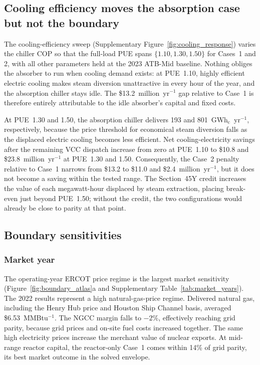 \documentclass[a4paper,fleqn]{cas-sc}
\begin{document}
\subsection{Cooling efficiency moves the absorption case but not the boundary}
\label{sec:results:pue}

The cooling-efficiency sweep (Supplementary Figure~\ref{fig:cooling_response}) varies the chiller COP so that the full-load PUE spans $\{1.10, 1.30, 1.50\}$ for Cases~1 and 2, with all other parameters held at the 2023 ATB-Mid baseline. Nothing obliges the absorber to run when cooling demand exists: at PUE~1.10, highly efficient electric cooling makes steam diversion unattractive in every hour of the year, and the absorption chiller stays idle. The \$13.2~million~yr$^{-1}$ gap relative to Case~1 is therefore entirely attributable to the idle absorber's capital and fixed costs.

At PUE~1.30 and 1.50, the absorption chiller delivers 193 and 801~GWh$_\mathrm{c}$~yr$^{-1}$, respectively, because the price threshold for economical steam diversion falls as the displaced electric cooling becomes less efficient. Net cooling-electricity savings after the remaining VCC dispatch increase from zero at PUE~1.10 to \$10.8 and \$23.8~million~yr$^{-1}$ at PUE~1.30 and 1.50. Consequently, the Case~2 penalty relative to Case~1 narrows from \$13.2 to \$11.0 and \$2.4~million~yr$^{-1}$, but it does not become a saving within the tested range. The Section~45Y credit increases the value of each megawatt-hour displaced by steam extraction, placing break-even just beyond PUE~1.50; without the credit, the two configurations would already be close to parity at that point.

\subsection{Boundary sensitivities}
\label{sec:results:frontier}

\subsubsection{Market year}
The operating-year ERCOT price regime is the largest market sensitivity (Figure~\ref{fig:boundary_atlas}a and Supplementary Table~\ref{tab:market_years}). The 2022 results represent a high natural-gas-price regime. Delivered natural gas, including the Henry Hub price and Houston Ship Channel basis, averaged \$6.53~MMBtu$^{-1}$. The NGCC margin falls to $-2\%$, effectively reaching grid parity, because grid prices and on-site fuel costs increased together. The same high electricity prices increase the merchant value of nuclear exports. At mid-range reactor capital, the reactor-only Case~1 comes within 14\% of grid parity, its best market outcome in the solved envelope.
\end{document}
